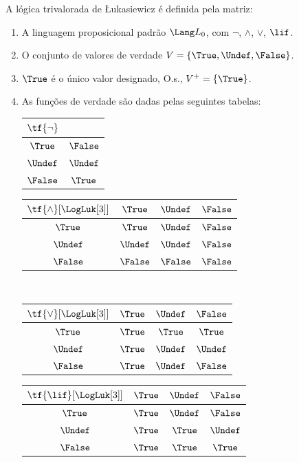 \documentclass[../../../include/open-logic-section]{subfiles}
\begin{document}
\begin{defn}
A lógica trivalorada de \L ukasiewicz é definida pela matriz:
\begin{enumerate}
  \item A linguagem proposicional padrão $\Lang L_0$, com
  $\lnot$, $\land$, $\lor$, $\lif$.
  \item O conjunto de valores de verdade $V = \{\True, \Undef, \False\}$.
  \item $\True$ é o único valor designado, O.s.\@, $V^+ = \{\True\}$.
  \item As funções de verdade são dadas pelas seguintes tabelas:
  \begin{center}
    \begin{tabular}{c|c} 
      $\tf{\lnot}$ & \\ 
      \hline  
      $\True$ & $\False$ \\ 
      $\Undef$ & $\Undef$ \\
      $\False$ & $\True$ 
    \end{tabular}
    \quad
    \begin{tabular}{c|ccc} 
      $\tf{\land}[\LogLuk[3]]$ & $\True$ & $\Undef$ & $\False$ \\ 
      \hline 
      $\True$ & $\True$ & $\Undef$ & $\False$ \\ 
      $\Undef$ & $\Undef$ & $\Undef$ & $\False$\\ 
      $\False$ & $\False$ & $\False$ & $\False$ 
    \end{tabular}
    \\[2ex]
    \begin{tabular}{c|ccc} 
      $\tf{\lor}[\LogLuk[3]]$ & $\True$ & $\Undef$ & $\False$ \\ 
      \hline 
      $\True$ & $\True$ & $\True$ & $\True$ \\ 
      $\Undef$ & $\True$ & $\Undef$ & $\Undef$ \\
      $\False$ & $\True$ & $\Undef$ & $\False$ 
    \end{tabular}
    \quad
    \begin{tabular}{c|ccc} 
      $\tf{\lif}[\LogLuk[3]]$ & $\True$ & $\Undef$ & $\False$ \\ 
      \hline 
      $\True$ & $\True$ & $\Undef$ & $\False$ \\ 
      $\Undef$ & $\True$ & $\True$ & $\Undef$  \\ 
      $\False$ & $\True$ & $\True$ & $\True$ 
    \end{tabular}
  \end{center} 
\end{enumerate}
\end{defn}
\end{document}
